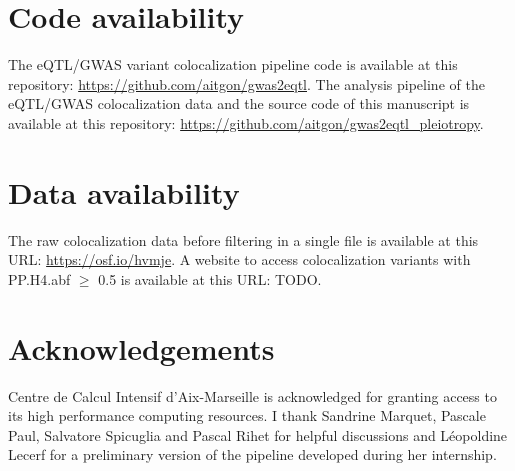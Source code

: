 \section*{Code availability}

The eQTL/GWAS variant colocalization pipeline code is available at this repository: \url{https://github.com/aitgon/gwas2eqtl}.
%
The analysis pipeline of the eQTL/GWAS colocalization data and the source code of this manuscript is available at this repository: \url{https://github.com/aitgon/gwas2eqtl_pleiotropy}.

\section*{Data availability}

The raw colocalization data before filtering in a single file is available at this URL: \url{https://osf.io/hvmje}.
%
A website to access colocalization variants with PP.H4.abf $\geq$ 0.5 is available at this URL: TODO.

\section*{Acknowledgements}

Centre de Calcul Intensif d'Aix-Marseille is acknowledged for granting access to its high performance computing resources.
%
I thank Sandrine Marquet, Pascale Paul, Salvatore Spicuglia and Pascal Rihet for helpful discussions and L\'eopoldine Lecerf for a preliminary version of the pipeline developed during her internship.

